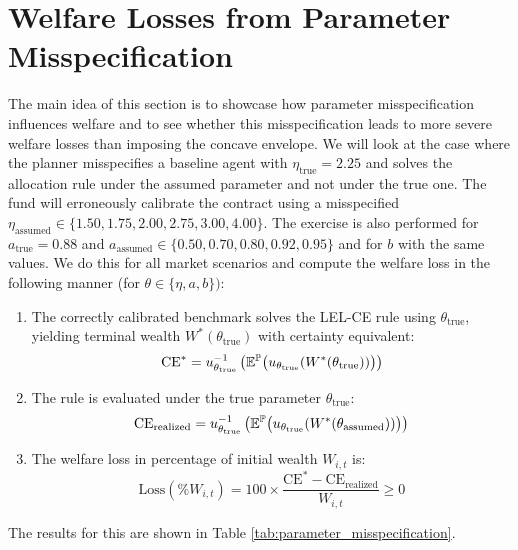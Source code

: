 \section{Welfare Losses from Parameter Misspecification}
The main idea of this section is to showcase how parameter misspecification influences welfare and to see whether this misspecification leads to more severe welfare losses than imposing the concave envelope. We will look at the case where the planner misspecifies a baseline agent with $\eta_{\text{true}} = 2.25$ \citep{KahnemanTversky1992} and solves the allocation rule under the assumed parameter and not under the true one. The fund will erroneously calibrate the contract using a misspecified $\eta_{\text{assumed}} \in \{1.50, 1.75, 2.00, 2.75, 3.00, 4.00\}$. The exercise is also performed for $a_{\text{true}} = 0.88$ and $a_{\text{assumed}} \in \{0.50, 0.70, 0.80, 0.92, 0.95\}$ and for $b$ with the same values. We do this for all market scenarios and compute the welfare loss in the following manner (for $\theta \in \{\eta, a, b\})$:
\begin{enumerate}
    \item The correctly calibrated benchmark solves the LEL-CE rule using $\theta_{\text{true}}$, yielding terminal wealth $W^*(\theta_{\text{true}})$ with certainty equivalent:
    \begin{equation*}
        \text{CE}^* = u_{\theta_{\text{true}}}^{-1}\left( \mathbb{E}^{\mathbb{P}}\big( u_{\theta_{\text{true}}}(W^*(\theta_{\text{true}})) \big) \right)
    \end{equation*}
    \item The rule is evaluated under the true parameter $\theta_{\text{true}}$:
    \begin{equation*}
        \text{CE}_{\text{realized}} = u_{\theta_{\text{true}}}^{-1}\left( \mathbb{E}^{\mathbb{P}}\big( u_{\theta_{\text{true}}}(W^*(\theta_{\text{assumed}})) \big)\right)
    \end{equation*}
    \item The welfare loss in percentage of initial wealth $W_{i,t}$ is:
    \begin{equation*}
        \text{Loss}(\%W_{i,t}) = 100 \times \frac{\text{CE}^* - \text{CE}_{\text{realized}}}{W_{i,t}} \geq 0
    \end{equation*}
\end{enumerate}
The results for this are shown in Table \ref{tab:parameter_misspecification}.
